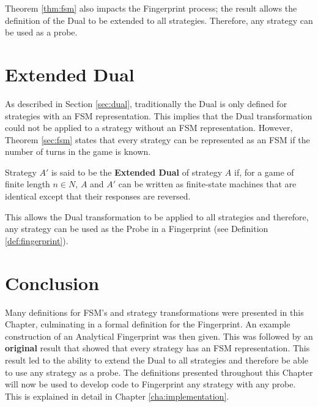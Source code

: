 Theorem \ref{thm:fsm} also impacts the Fingerprint process; the result allows the definition of the Dual to be extended to all strategies.
Therefore, any strategy can be used as a probe.



\section{Extended Dual}\label{sec:extend-dual}

As described in Section \ref{sec:dual}, traditionally the Dual is only defined for strategies with an FSM representation.
This implies that the Dual transformation could not be applied to a strategy without an FSM representation.
However, Theorem \ref{sec:fsm} states that every strategy can be represented as an FSM if the number of turns in the game is known.

\begin{definition}\label{def:extend-dual}
Strategy $A'$ is said to be the \textbf{Extended Dual} of strategy $A$ if, for a game of finite length $n \in N$, $A$ and $A'$ can be written as finite-state machines that are identical except that their responses are reversed.
\end{definition}

This allows the Dual transformation to be applied to all strategies and therefore, any strategy can be used as the Probe in a Fingerprint (see Definition \ref{def:fingerprint}).



\section{Conclusion}

Many definitions for FSM's and strategy transformations were presented in this Chapter, culminating in a formal definition for the Fingerprint.
An example construction of an Analytical Fingerprint was then given.
This was followed by an \textbf{original} result that showed that every strategy has an FSM representation.
This result led to the ability to extend the Dual to all strategies and therefore be able to use any strategy as a probe.
The definitions presented throughout this Chapter will now be used to develop code to Fingerprint any strategy with any probe.
This is explained in detail in Chapter \ref{cha:implementation}.

